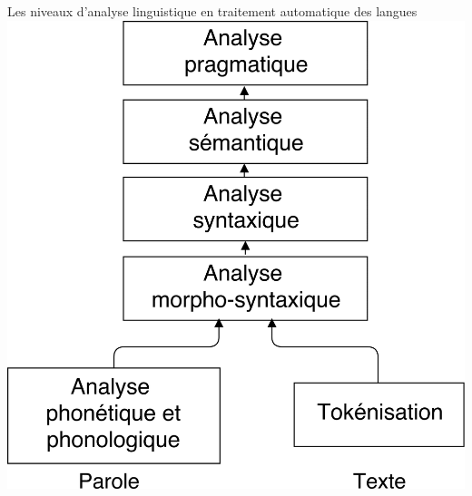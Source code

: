 \documentclass[french]{beamer}
\begin{document}
\begin{frame}{Les niveaux d'analyse linguistique en traitement automatique des langues}
  \centering
  \includegraphics[scale=0.12]{figures/niveaux-0-trans.png}
\end{frame}
\end{document}
